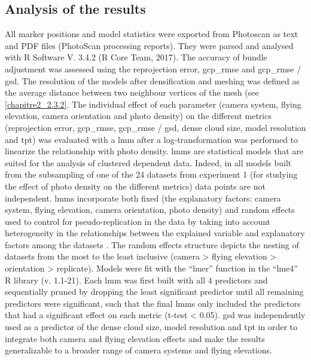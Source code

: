 \subsection{Analysis of the results}\label{chapitre2_2.4}
All marker positions and model statistics were exported from Photoscan as text and PDF files (PhotoScan processing reports). They were parsed and analysed with R Software V. 3.4.2 (R Core Team, 2017). The accuracy of bundle adjustment was assessed using the reprojection error, \acrshort{gcp_rmse} and \acrshort{gcp_rmse} / \acrshort{gsd}. The resolution of the models after densification and meshing was defined as the average distance between two neighbour vertices of the mesh (see \autoref{chapitre2_2.3.2}. The individual effect of each parameter (camera system, flying elevation, camera orientation and photo density) on the different metrics (reprojection error, \acrshort{gcp_rmse}, \acrshort{gcp_rmse} / \acrshort{gsd}, dense cloud size, model resolution and \acrshort{tpt}) was evaluated with a \gls{lmm} \citep{zuur_mixed_2009} after a log-transformation was performed to linearize the relationship with photo density. \acrshort{lmm}s are statistical models that are suited for the analysis of clustered dependent data. Indeed, in all models built from the subsampling of one of the 24 datasets from experiment 1 (for studying the effect of photo density on the different metrics) data points are not independent. \acrshort{lmm}s incorporate both fixed (the explanatory factors: camera system, flying elevation, camera orientation, photo density) and random effects used to control for pseudo-replication in the data by taking into account heterogeneity in the relationships between the explained variable and explanatory factors among the datasets \citep{patino_accounting_2013}. The random effects structure depicts the nesting of datasets from the most to the least inclusive (camera > flying elevation > orientation > replicate). Models were fit with the “lmer” function in the “lme4” R library (v. 1.1-21). Each \acrshort{lmm} was first built with all 4 predictors and sequentially pruned by dropping the least significant predictor until all remaining predictors were significant, such that the final \acrshort{lmm}s only included the predictors that had a significant effect on each metric (t-test < 0.05). \acrshort{gsd} was independently used as a predictor of the dense cloud size, model resolution and \acrshort{tpt} in order to integrate both camera and flying elevation effects and make the results generalizable to a broader range of camera systems and flying elevations.

